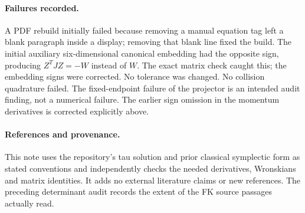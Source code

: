 \documentclass[11pt]{article}
\begin{document}
\paragraph{Failures recorded.}
A PDF rebuild initially failed because removing a manual equation tag left
a blank paragraph inside a display; removing that blank line fixed the build.
The initial auxiliary six-dimensional canonical embedding had the opposite
sign, producing $Z^TJZ=-W$ instead of $W$. The exact matrix check caught this;
the embedding signs were corrected. No tolerance was changed. No collision
quadrature failed. The fixed-endpoint failure of the projector is an intended
audit finding, not a numerical failure. The earlier sign omission in the
momentum derivatives is corrected explicitly above.

\paragraph{References and provenance.}
This note uses the repository's tau solution and prior classical symplectic
form as stated conventions and independently checks the needed derivatives,
Wronskians and matrix identities. It adds no external literature claims or
new references. The preceding determinant audit records the extent of the
FK source passages actually read.
\end{document}
